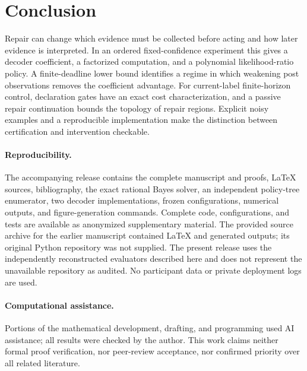 \section{Conclusion}
Repair can change which evidence must be collected before acting and how
later evidence is interpreted. In an ordered fixed-confidence experiment this
gives a decoder coefficient, a factorized computation, and a polynomial
likelihood-ratio policy. A finite-deadline lower bound identifies a regime in
which weakening post observations removes the coefficient advantage.
For current-label finite-horizon control, declaration gates have an exact
cost characterization, and a passive repair continuation bounds the topology
of repair regions. Explicit noisy examples and a reproducible implementation
make the distinction between certification and intervention checkable.

\paragraph{Reproducibility.}
The accompanying release contains the complete manuscript and proofs, LaTeX
sources, bibliography, the exact rational Bayes solver, an independent
policy-tree enumerator, two decoder implementations, frozen configurations,
numerical outputs, and figure-generation commands. Complete code,
configurations, and tests are available as anonymized supplementary material.
The provided source archive for the earlier manuscript contained LaTeX and
generated outputs; its original Python repository was not supplied. The
present release uses the independently reconstructed evaluators described here
and does not represent the unavailable repository as audited. No participant
data or private deployment logs are used.

\paragraph{Computational assistance.}
Portions of the mathematical development, drafting, and programming used AI
assistance; all results were checked by the author. This work claims neither
formal proof verification, nor peer-review acceptance, nor confirmed priority
over all related literature.
